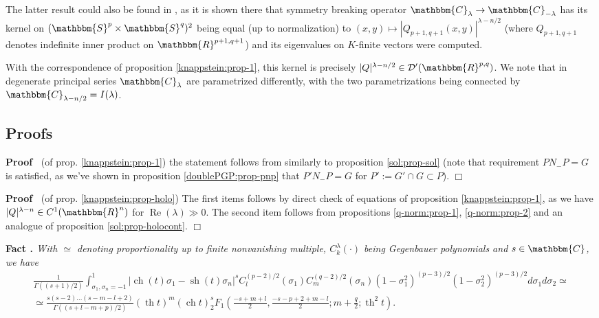 \documentclass{article}
\newcommand{\assign}{:=}
\newcommand{\nosymbol}{}
\newcommand{\tmop}[1]{\ensuremath{\operatorname{#1}}}
\newcommand{\tmtextbf}[1]{{\bfseries{#1}}}
\newcommand{\tmtextit}[1]{{\itshape{#1}}}
\newcommand{\tmtextup}[1]{{\upshape{#1}}}
\newenvironment{proof}{\noindent\textbf{Proof\ }}{\hspace*{\fill}$\Box$\medskip}
\numberwithin{definition}{section}
\numberwithin{lemma}{section}
\numberwithin{proposition}{section}
{\theorembodyfont{\rmfamily}\newtheorem{remark}{Remark}
\numberwithin{remark}{section}
}
\begin{document}
\begin{remark}
  The latter result could also be found in {\cite[thm. 3.9.1]{KO1}}, as it is
  shown there that symmetry breaking operator $\mathbbm{C}_{\lambda}
  \rightarrow \mathbbm{C}_{- \lambda}$ has its kernel on $( \mathbbm{S}^p
  \times \mathbbm{S}^q)^2$ being equal (up to normalization) to $( x, y)
  \mapsto | Q_{p + 1, q + 1} ( x, y) |^{\lambda - n / 2}$ (where $Q_{p + 1, q
  + 1}$ denotes indefinite inner product on $\mathbbm{R}^{p + 1, q + 1}$) and
  its eigenvalues on $K$-finite vectors were computed.
  
  With the correspondence of proposition \ref{knappstein:prop-1}, this kernel
  is precisely $| Q |^{\lambda - n / 2} \in \mathcal{D}' ( \mathbbm{R}^{p, q})
  \nosymbol$. We note that in {\cite{KO1}} degenerate principal series
  $\mathbbm{C}_{\lambda}$ are parametrized differently, with the two
  parametrizations being connected by $\mathbbm{C}_{\lambda - n / 2} = I (
  \lambda)$.
\end{remark}

\subsection{Proofs}

\begin{proof}
  (of prop. \ref{knappstein:prop-1}) the statement follows from {\cite[thm.
  3.16]{kobayashi2015symmetry}} similarly to proposition \ref{sol:prop-sol}
  (note that requirement $P N_- P = G$ is satisfied, as we've shown in
  proposition \ref{doublePGP:prop-pnp} that $P' N_- P = G$ for $P' \assign G'
  \cap G \subset P$).
\end{proof}

\begin{proof}
  (of prop. \ref{knappstein:prop-holo}) The first items follows by direct
  check of equations of proposition \ref{knappstein:prop-1}, as we have $| Q
  |^{\lambda - n} \in C^1 ( \mathbbm{R}^n)$ for $\tmop{Re} ( \lambda) \gg 0$.
  The second item follows from propositions \ref{q-norm:prop-1},
  \ref{q-norm:prop-2} and an analogue of proposition \ref{sol:prop-holocont}.
\end{proof}

{\noindent}\tmtextbf{Fact \tmtextup{20}.
}\tmtextit{\label{knappstein:fact-faraut}{\cite[appendix
B]{faraut1979distributions}} With $\simeq$ denoting proportionality up to
finite nonvanishing multiple, $C^{\lambda}_k ( \cdot)$ being Gegenbauer
polynomials and $s \in \mathbbm{C}$, we have
\begin{eqnarray*}
  & \frac{1}{\Gamma ( ( s + 1) / 2)} \int_{\sigma_1, \sigma_n = - 1}^1 |
  \tmop{ch} ( t) \sigma_1 - \tmop{sh} ( t) \sigma_n |^s C_l^{( p - 2) / 2} (
  \sigma_1) C^{( q - 2) / 2}_m ( \sigma_n) ( 1 - \sigma_1^2)^{( p - 3) / 2} (
  1 - \sigma_2^2)^{( p - 3) / 2} d \sigma_1^{} d \sigma_2 \simeq & \\
  & \simeq \frac{s ( s - 2) \ldots ( s - m - l + 2)}{\Gamma ( ( s + l - m +
  p) / 2)} ( \tmop{th} t)^m ( \tmop{ch} t)^s _2 F_1 \left( \frac{- s + m +
  l}{2}, \frac{- s - p + 2 + m - l}{2} ; m + \frac{q}{2} ; \tmop{th}^2 t
  \right) . & 
\end{eqnarray*}}{\hspace*{\fill}}{\medskip}
\end{document}
